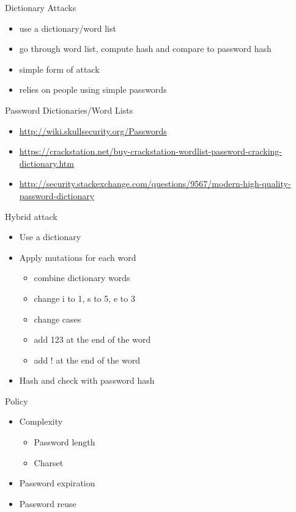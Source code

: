 \documentclass{curs}
\begin{document}
\begin{frame}{Dictionary Attacks}
  \begin{itemize}
    \item use a dictionary/word list
    \item go through word list, compute hash and compare to password hash
    \item simple form of attack
    \item relies on people using simple passwords
  \end{itemize}
\end{frame}

\begin{frame}{Password Dictionaries/Word Lists}
  \begin{itemize}
    \item \url{http://wiki.skullsecurity.org/Passwords}
    \item
      \url{https://crackstation.net/buy-crackstation-wordlist-password-cracking-dictionary.htm}
    \item
      \url{http://security.stackexchange.com/questions/9567/modern-high-quality-password-dictionary}
  \end{itemize}
\end{frame}

\begin{frame}{Hybrid attack}
  \begin{itemize}
    \item Use a dictionary
    \item Apply mutations for each word
      \begin{itemize}
       \item combine dictionary words
        \item change i to 1, s to 5, e to 3
        \item change cases
        \item add 123 at the end of the word
        \item add ! at the end of the word
      \end{itemize}
    \item Hash and check with password hash
  \end{itemize}
\end{frame}


\begin{frame}{Policy}
  \begin{itemize}
    \item Complexity
      \begin{itemize}
        \item Password length
        \item Charset
      \end{itemize}
    \item Password expiration
    \item Password reuse
  \end{itemize}
\end{frame}
\end{document}
